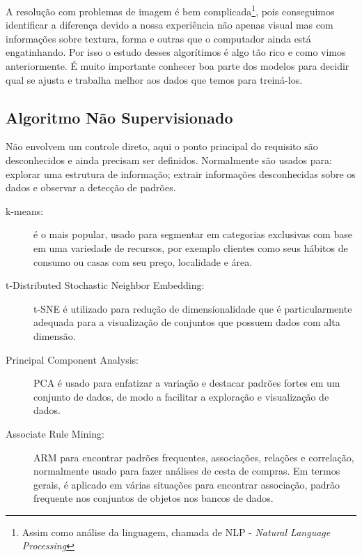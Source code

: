 A resolução com problemas de imagem é bem complicada\footnote{Assim como análise da linguagem, chamada de NLP - \textit{Natural Language Processing}}, pois conseguimos identificar a diferença devido a nossa experiência não apenas visual mas com informações sobre textura, forma e outras que o computador ainda está engatinhando. Por isso o estudo desses algorítimos é algo tão rico e como vimos anteriormente. É muito importante conhecer boa parte dos modelos para decidir qual se ajusta e trabalha melhor aos dados que temos para treiná-los.

\subsection{Algoritmo Não Supervisionado}
Não envolvem um controle direto, aqui o ponto principal do requisito são desconhecidos e ainda precisam ser definidos. Normalmente são usados para: explorar uma estrutura de informação; extrair informações desconhecidas sobre os dados e observar a detecção de padrões.
\begin{description}
	\item[k-means:] é o mais popular, usado para segmentar em categorias exclusivas com base em uma variedade de recursos, por exemplo clientes como seus hábitos de consumo ou casas com seu preço, localidade e área.
	\item[t-Distributed Stochastic Neighbor Embedding:] t-SNE é utilizado para redução de dimensionalidade que é particularmente adequada para a visualização de conjuntos que possuem dados com alta dimensão.
	\item[Principal Component Analysis:] PCA é usado para enfatizar a variação e destacar padrões fortes em um conjunto de dados, de modo a facilitar a exploração e visualização de dados.
	\item[Associate Rule Mining:] ARM para encontrar padrões frequentes, associações, relações e correlação, normalmente usado para fazer análises de cesta de compras. Em termos gerais, é aplicado em várias situações para encontrar associação, padrão frequente nos conjuntos de objetos nos bancos de dados.
\end{description}

